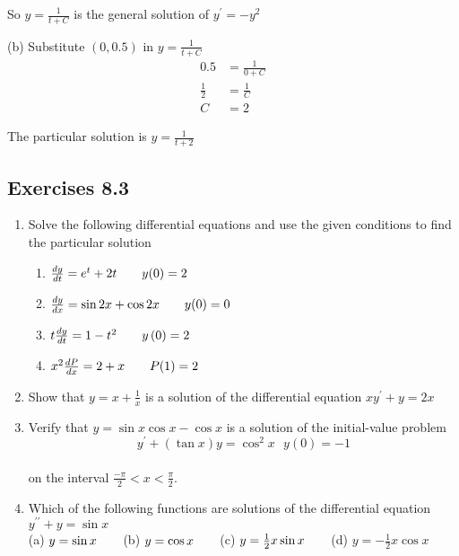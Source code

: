 So $y =\frac{1}{t +C}$ is the general solution of $y^{ \prime } = -y^{2}$ 

(b) Substitute $\left (0 ,0.5\right )$ in $y =\frac{1}{t +C}$
\begin{align*}0.5 &    = \frac{1}{0 +C} \\
\frac{1}{2} &    = \frac{1}{C} \\
C &    = 2\end{align*}

The particular solution is $y =\frac{1}{t +2}$ 

\subsection{Exercises 8.3}
\begin{enumerate}
\item Solve the following differential equations and use the given conditions to find the particular solution 


\begin{enumerate}
\item $\frac{d y}{d t} =e^{t} +2 t\text{\quad \quad }y (0) =2$ 

\item $\frac{d y}{d x} =\sin  2 x +\cos  2 x\text{\quad \quad }y (0) =0$ 

\item $t \frac{d y}{d t} =1 -t^{2}\text{\quad \quad }y \left (0\right ) =2$ 

\item $x^{2} \frac{d P}{d x} =2 +x\text{\quad \quad }P (1) =2$ \end{enumerate}


\item Show that $y =x +\frac{1}{x}$ is a solution of the differential equation $x y^{ \prime } +y =2 x$ 

\item Verify that $y =\sin  x \cos  x -\cos  x$ is a solution of the initial-value problem
\begin{equation*}y^{ \prime } +\left (\tan  x\right ) y =\cos ^{2} x\text{\  \  \  \  \  \  \  \  }y (0) = -1
\end{equation*} \\\relax on the interval $\frac{ -\pi }{2} <x <\frac{\pi }{2}\text{.}$ 

\item Which of the following functions are solutions of the differential
equation $y^{ \prime  \prime } +y =\sin  x$ \\\relax (a)  $y =\sin  x\text{\quad \quad }$(b)  $y =\cos  x\text{\quad \quad }$(c)  $y =\frac{1}{2} x \sin  x\text{\quad \quad }$(d)  $y = -\frac{1}{2} x \cos  x$ 


\end{enumerate}
